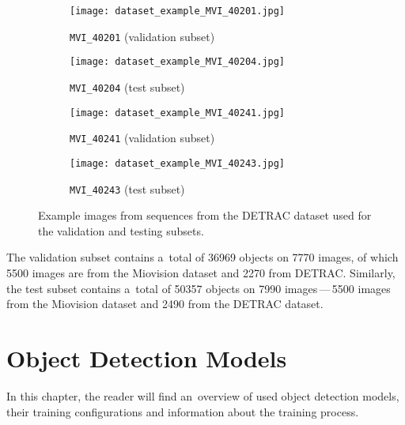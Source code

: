 \begin{figure}[t]
    \centering
    \begin{subfigure}[b]{0.495\textwidth}
        \texttt{[image: dataset\_example\_MVI\_40201.jpg]}
        \caption{\texttt{MVI\_40201} (validation subset)}
    \end{subfigure}
    \begin{subfigure}[b]{0.495\textwidth}
        \texttt{[image: dataset\_example\_MVI\_40204.jpg]}
        \caption{\texttt{MVI\_40204} (test subset)}
    \end{subfigure}
    \begin{subfigure}[b]{0.495\textwidth}
        \texttt{[image: dataset\_example\_MVI\_40241.jpg]}
        \caption{\texttt{MVI\_40241} (validation subset)}
    \end{subfigure}
    \begin{subfigure}[b]{0.495\textwidth}
        \texttt{[image: dataset\_example\_MVI\_40243.jpg]}
        \caption{\texttt{MVI\_40243} (test subset)}
    \end{subfigure}
    \caption{Example images from sequences from the DETRAC dataset used for
    the validation and testing subsets.}
    \label{TestValExamples}
\end{figure}

The validation subset contains a~total of \num{36969} objects on \num{7770}
images, of which \num{5500} images are from the Miovision dataset and \num{2270}
from DETRAC. Similarly, the test subset contains a~total of \num{50357}
objects on \num{7990} images\,---\,\num{5500} images from the Miovision dataset and
\num{2490} from the DETRAC dataset.




\chapter{Object Detection Models}
\label{ModelsChapter}




In this chapter, the reader will find an~overview of used object detection
models, their training configurations and information about the training
process.


